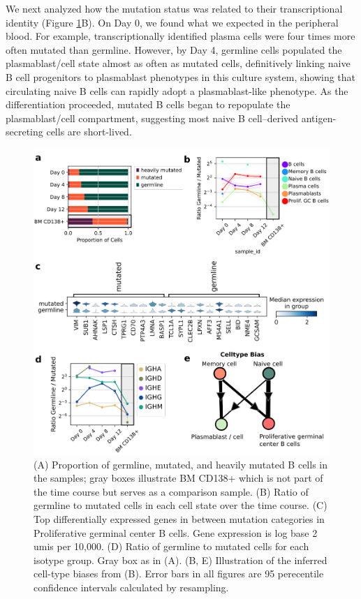 We next analyzed how the mutation status was related to their transcriptional identity (Figure \ref{fig:paper2_fig_2}B). On Day 0, we found what we expected in the peripheral blood. For example, transcriptionally identified plasma cells were four times more often mutated than germline. However, by Day 4, germline cells populated the plasmablast/cell state almost as often as mutated cells, definitively linking naive B cell progenitors to plasmablast phenotypes in this culture system, showing that circulating naive B cells can rapidly adopt a plasmablast-like phenotype. As the differentiation proceeded, mutated B cells began to repopulate the plasmablast/cell compartment, suggesting most naive B cell–derived antigen-secreting cells are short-lived.
\begin{figure}[hbt!]
\centering
\includegraphics[width=14cm, keepaspectratio]{figs/InVitro/fig2_bcd.png}
\caption[Characterization of cell-intrinsic phenotypes using VDJ mutation status.]{(A) Proportion of germline, mutated, and heavily mutated B cells in the samples; gray boxes illustrate BM CD138+ which is not part of the time course but serves as a comparison sample. (B) Ratio of germline to mutated cells in each cell state over the time course. (C) Top differentially expressed genes in between mutation categories in Proliferative germinal center B cells. Gene expression is log base 2 umis per 10,000. (D) Ratio of germline to mutated cells for each isotype group. Gray box as in (A). (B, E) Illustration of the inferred cell-type biases from (B). Error bars in all figures are 95 perecentile confidence intervals calculated by resampling.}
\label{fig:paper2_fig_2}
\end{figure}

